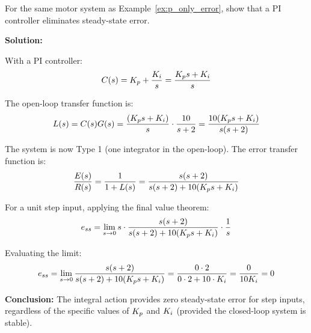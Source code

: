 \begin{examplebox}
\label{ex:pi_zero_error}
For the same motor system as Example~\ref{ex:p_only_error}, show that a PI controller eliminates steady-state error.

\textbf{Solution:}

With a PI controller:
\begin{equation*}
C(s) = K_p + \frac{K_i}{s} = \frac{K_p s + K_i}{s}
\end{equation*}

The open-loop transfer function is:
\begin{equation*}
L(s) = C(s)G(s) = \frac{(K_p s + K_i)}{s} \cdot \frac{10}{s + 2} = \frac{10(K_p s + K_i)}{s(s + 2)}
\end{equation*}

The system is now Type 1 (one integrator in the open-loop). The error transfer function is:
\begin{equation*}
\frac{E(s)}{R(s)} = \frac{1}{1 + L(s)} = \frac{s(s+2)}{s(s+2) + 10(K_p s + K_i)}
\end{equation*}

For a unit step input, applying the final value theorem:
\begin{equation*}
e_{ss} = \lim_{s \to 0} s \cdot \frac{s(s+2)}{s(s+2) + 10(K_p s + K_i)} \cdot \frac{1}{s}
\end{equation*}

Evaluating the limit:
\begin{equation*}
e_{ss} = \lim_{s \to 0} \frac{s(s+2)}{s(s+2) + 10(K_p s + K_i)} = \frac{0 \cdot 2}{0 \cdot 2 + 10 \cdot K_i} = \frac{0}{10K_i} = 0
\end{equation*}

\textbf{Conclusion:} The integral action provides zero steady-state error for step inputs, regardless of the specific values of $K_p$ and $K_i$ (provided the closed-loop system is stable).
\end{examplebox}

